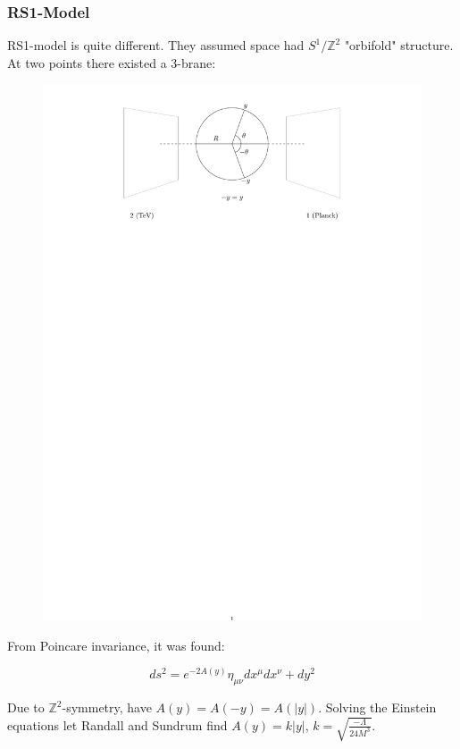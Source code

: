 \documentclass[10pt]{beamer}
\begin{document}
	\begin{frame}
		\frametitle{RS1-Model}
		RS1-model is quite different. They assumed space had $S^1/\mathbb{Z}^2$ "orbifold" structure. At two points there existed a 3-brane:
		
		\begin{figure}[H]
			\centering
			\includegraphics[trim={12cm 22cm 11.5cm 0cm},scale=0.4]{RS1.pdf}
			\label{fig:gravitonChannel}
		\end{figure}
		
		From Poincare invariance, it was found:
		
		\begin{equation}
			ds^2 = e^{-2A(y)}\eta_{\mu\nu}dx^\mu dx^\nu + dy^2
		\end{equation}
		
		Due to $\mathbb{Z}^2$-symmetry, have $A(y) = A(-y) = A(|y|)$. Solving the Einstein equations let Randall and Sundrum find $A(y) = k|y|$, $k=\sqrt{\frac{-\Lambda}{24M^3}}$.
		
	\end{frame}
	
\end{document}
